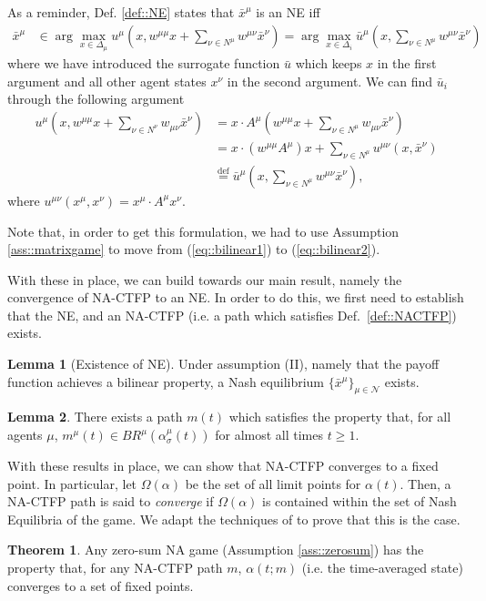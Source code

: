 \documentclass{article}
\theoremstyle{definition}
\newtheorem{theorem}{Theorem}
\newtheorem{lemma}{Lemma}
\newcommand{\agentset}{\mathcal{N}}
\newcommand{\xmu}{x^{\mu}}
\newcommand{\xnu}{x^{\nu}}
\newcommand{\NE}[1]{\bar{x}^{#1}}
\begin{document}
  As a reminder,
  Def. \ref{def::NE} states that $\NE{\mu}$ is an NE iff
%
  \begin{align*}
    \NE{\mu} &\in \arg\max_{x \in \Delta_\mu} u^\mu(x, w^{\mu \mu}x + \sum_{\nu \in N^\mu} w^{\mu \nu} \NE{\nu}) \nonumber  = \arg\max_{x \in \Delta_i} \bar{u}^\mu(x, \sum_{\nu \in N^\mu} w^{\mu \nu} \NE{\nu})
  \end{align*}
%
  where we have introduced the surrogate function $\bar{u}$ which keeps $x$ in the first argument and all other agent states $\xnu$ in the second argument. We can find $\bar{u}_i$ through the following argument
%  
  \begin{align}
    u^\mu(x, w^{\mu \mu} x + \sum_{\nu \in N^\nu} w_{\mu \nu} \NE{\nu}) & = x \cdot A^\mu (w^{\mu \mu} x + \sum_{\nu \in N^\mu} w_{\mu \nu} \NE{\nu}) \label{eq::bilinear1}\\
     & = x \cdot (w^{\mu \mu} A^\mu)  x + \sum_{\nu \in N^\mu} u^{\mu \nu}(x, \NE{\nu}) \label{eq::bilinear2} \\
     & \stackrel{\text{def}}{=} \bar{u}^\mu(x, \sum_{\nu \in N^\mu} w^{\mu \nu} \NE{\nu}), \nonumber
  \end{align}
%  
  where $u^{\mu \nu}(\xmu, x^\nu) = \xmu \cdot A^\mu x^\nu$.

  Note that, in order to get this formulation, we had to use Assumption \ref{ass::matrixgame}
 to move from (\ref{eq::bilinear1}) to (\ref{eq::bilinear2}).

  With these in place, we can build towards our main result, namely
  the convergence of NA-CTFP to an NE. In order to do this, we first
  need to establish that the NE, and an NA-CTFP (i.e. a path which
  satisfies Def.~\ref{def::NACTFP}) exists.
  
  \begin{lemma}[Existence of NE]
    Under assumption (II), namely that the payoff function achieves a bilinear property, a
    Nash equilibrium $\{\bar{x}^\mu\}_{\mu \in \agentset}$ exists.
  \end{lemma}

  \begin{lemma}
    There exists a path $m(t)$ which satisfies the property that, for all agents $\mu$, $m^\mu(t) \in
    BR^\mu(\alpha_\sigma^\mu(t))$ for almost all times $t \geq 1$.
  \end{lemma}

With these results in place, we can show that NA-CTFP converges
to a fixed point. In particular, let $\Omega(\alpha)$ be the set of
all limit points for $\alpha(t)$. Then, a NA-CTFP path is said to {\em 
converge} if $\Omega(\alpha)$ is contained within the set of Nash
Equilibria of the game. We adapt the techniques
of \cite{Ewerhart2020} to prove that this is the case.
%
  \begin{theorem} \label{thm::NACTFPtoFixed}
    Any zero-sum NA game (Assumption \ref{ass::zerosum}) has the property that, for any NA-CTFP path $m$, $\alpha(t; m)$ (i.e. the time-averaged state) converges to a set of fixed points.
  \end{theorem}
\end{document}
